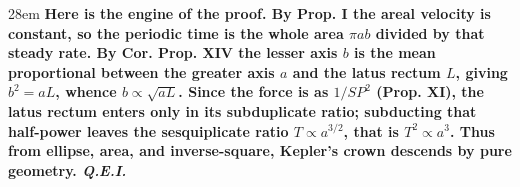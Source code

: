 \documentclass[border=4pt]{standalone}
\begin{document}
\begin{varwidth}{28em}
\large\bfseries
Here is the engine of the proof. By Prop. I the areal velocity is constant, so      \textcolor{timeblue}{the periodic time is the whole area $\pi a b$ divided by that steady rate}.      By Cor. Prop. XIV \textcolor{meangreen}{the lesser axis $b$ is the mean proportional between the greater axis      $a$ and the latus rectum $L$}, giving \textcolor{meangreen}{$b^2 = aL$}, whence $b \propto \sqrt{aL}$.      Since the force is as $1/SP^2$ (Prop. XI), the latus rectum enters only in its subduplicate ratio;      subducting that half-power leaves \textcolor{axisorange}{the sesquiplicate ratio $T \propto a^{3/2}$}, that is      \textcolor{axisorange}{$T^2 \propto a^3$}. Thus from ellipse, area, and inverse-square, Kepler's crown descends by pure geometry. \textit{Q.E.I.}
\end{varwidth}
\end{document}
